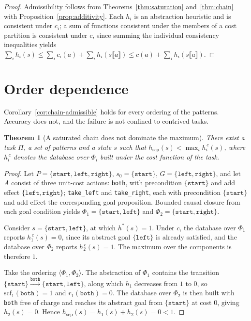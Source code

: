 \documentclass[10pt,twocolumn,a4paper]{article}
\theoremstyle{plain}
\newtheorem{theorem}{Theorem}
\theoremstyle{definition}
\theoremstyle{remark}
\newcommand{\Task}{\Pi}
\newcommand{\hstar}{h^{*}}
\newcommand{\scf}{\mathrm{scf}}
\newcommand{\code}[1]{\texttt{#1}}
\begin{document}
\begin{proof}
Admissibility follows from Theorems~\ref{thm:saturation} and~\ref{thm:chain}
with Proposition~\ref{prop:additivity}. Each $h_i$ is an abstraction heuristic
and is consistent under $c_i$; a sum of functions consistent under the members
of a cost partition is consistent under $c$, since summing the individual
consistency inequalities yields
$\sum_i h_i(s) \le \sum_i c_i(a) + \sum_i h_i(s\llbracket a \rrbracket)
\le c(a) + \sum_i h_i(s\llbracket a \rrbracket)$.
\end{proof}

\section{Order dependence}
\label{sec:order}

Corollary~\ref{cor:chain-admissible} holds for every ordering of the patterns.
Accuracy does not, and the failure is not confined to contrived tasks.

\begin{theorem}[A saturated chain does not dominate the maximum]
\label{thm:nodomination}
There exist a task $\Task$, a set of patterns and a state $s$ such that
$h_{\mathrm{scp}}(s) < \max_i h_i^{\,c}(s)$, where $h_i^{\,c}$ denotes the
database over $\Phi_i$ built under the cost function of the task.
\end{theorem}

\begin{proof}
Let $P = \{\code{start}, \code{left}, \code{right}\}$,
$s_0 = \{\code{start}\}$, $G = \{\code{left}, \code{right}\}$, and let $A$
consist of three unit-cost actions: \code{both}, with precondition
$\{\code{start}\}$ and add effect $\{\code{left}, \code{right}\}$;
\code{take\_left} and \code{take\_right}, each with precondition
$\{\code{start}\}$ and add effect the corresponding goal proposition. Bounded
causal closure from each goal condition yields
$\Phi_1 = \{\code{start}, \code{left}\}$ and
$\Phi_2 = \{\code{start}, \code{right}\}$.

Consider $s = \{\code{start}, \code{left}\}$, at which $\hstar(s) = 1$. Under
$c$, the database over $\Phi_1$ reports $h_1^{\,c}(s) = 0$, since its abstract
goal $\{\code{left}\}$ is already satisfied, and the database over $\Phi_2$
reports $h_2^{\,c}(s) = 1$. The maximum over the components is therefore $1$.

Take the ordering $\langle \Phi_1, \Phi_2 \rangle$. The abstraction of $\Phi_1$
contains the transition
$\{\code{start}\} \xrightarrow{\code{both}} \{\code{start}, \code{left}\}$,
along which $h_1$ decreases from $1$ to $0$, so
$\scf_1(\code{both}) = 1$ and $r_1(\code{both}) = 0$. The database over
$\Phi_2$ is then built with \code{both} free of charge and reaches its abstract
goal from $\{\code{start}\}$ at cost $0$, giving $h_2(s) = 0$. Hence
$h_{\mathrm{scp}}(s) = h_1(s) + h_2(s) = 0 < 1$.
\end{proof}
\end{document}
